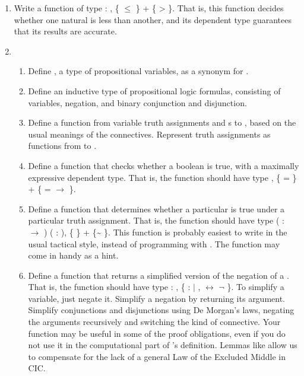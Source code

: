 \documentclass[12pt]{report}
\begin{document}
\begin{enumerate}
\item Write a function of type \coqdockw{\ensuremath{\forall}}   : , \{ \ensuremath{\le} \} + \{ > \}.  That is, this function decides whether one natural is less than another, and its dependent type guarantees that its results are accurate.


\item \begin{enumerate}
  \item Define , a type of propositional variables, as a synonym for .
  \item Define an inductive type  of propositional logic formulas, consisting of variables, negation, and binary conjunction and disjunction.
  \item Define a function  from variable truth assignments and s to , based on the usual meanings of the connectives.  Represent truth assignments as functions from  to .
  \item Define a function  that checks whether a boolean is true, with a maximally expressive dependent type.  That is, the function should have type \coqdockw{\ensuremath{\forall}} , \{ = \} + \{ =  \ensuremath{\rightarrow} \}. 
  \item Define a function  that determines whether a particular  is true under a particular truth assignment.  That is, the function should have type \coqdockw{\ensuremath{\forall}} ( :  \ensuremath{\rightarrow} ) ( : ), \{  \} + \{\~{}   \}.  This function is probably easiest to write in the usual tactical style, instead of programming with .  The function  may come in handy as a hint.
  \item Define a function  that returns a simplified version of the negation of a .  That is, the function should have type \coqdockw{\ensuremath{\forall}}  : , \{ :  \ensuremath{|} \coqdockw{\ensuremath{\forall}} ,    \ensuremath{\leftrightarrow} \ensuremath{\lnot}   \}.  To simplify a variable, just negate it.  Simplify a negation by returning its argument.  Simplify conjunctions and disjunctions using De Morgan's laws, negating the arguments recursively and switching the kind of connective.  Your  function may be useful in some of the proof obligations, even if you do not use it in the computational part of 's definition.  Lemmas like  allow us to compensate for the lack of a general Law of the Excluded Middle in CIC.

\end{enumerate}
\end{enumerate}
\end{document}
